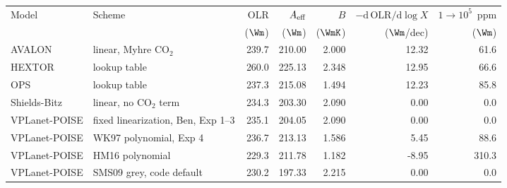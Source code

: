 \scriptsize
\begin{tabular}{llrrrrr}
\toprule
Model & Scheme & OLR & $A_{\rm eff}$ & $B$ & $-\mathrm{d\,OLR}/\mathrm{d}\log X$ & $1\to10^5$~ppm \\
 & & ($\Wm$) & ($\Wm$) & ($\WmK$) & ($\Wm$/dec) & ($\Wm$) \\
\midrule
AVALON & linear, Myhre CO$_2$ & 239.7 & 210.00 & 2.000 & 12.32 & 61.6 \\
HEXTOR & lookup table & 260.0 & 225.13 & 2.348 & 12.95 & 66.6 \\
OPS & lookup table & 237.3 & 215.08 & 1.494 & 12.23 & 85.8 \\
Shields-Bitz & linear, no CO$_2$ term & 234.3 & 203.30 & 2.090 & 0.00 & 0.0 \\
VPLanet-POISE & fixed linearization, Ben, Exp 1--3 & 235.1 & 204.05 & 2.090 & 0.00 & 0.0 \\
VPLanet-POISE & WK97 polynomial, Exp 4 & 236.7 & 213.13 & 1.586 & 5.45 & 88.6 \\
VPLanet-POISE & HM16 polynomial & 229.3 & 211.78 & 1.182 & -8.95 & 310.3 \\
VPLanet-POISE & SMS09 grey, code default & 230.2 & 197.33 & 2.215 & 0.00 & 0.0 \\
\bottomrule
\end{tabular}
